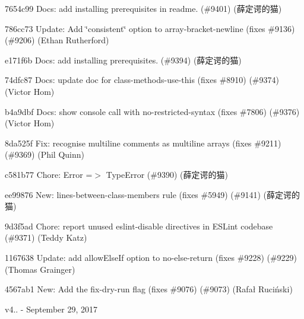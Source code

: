 \begin{DoxyItemize}
\item 7654c99 Docs\+: add installing prerequisites in readme. (\#9401) (薛定谔的猫)
\item 786cc73 Update\+: Add \char`\"{}consistent\char`\"{} option to array-\/bracket-\/newline (fixes \#9136) (\#9206) (Ethan Rutherford)
\item e171f6b Docs\+: add installing prerequisites. (\#9394) (薛定谔的猫)
\item 74dfc87 Docs\+: update doc for class-\/methods-\/use-\/this (fixes \#8910) (\#9374) (Victor Hom)
\item b4a9dbf Docs\+: show console call with no-\/restricted-\/syntax (fixes \#7806) (\#9376) (Victor Hom)
\item 8da525f Fix\+: recognise multiline comments as multiline arrays (fixes \#9211) (\#9369) (Phil Quinn)
\item c581b77 Chore\+: Error =$>$ Type\+Error (\#9390) (薛定谔的猫)
\item ee99876 New\+: lines-\/between-\/class-\/members rule (fixes \#5949) (\#9141) (薛定谔的猫)
\item 9d3f5ad Chore\+: report unused eslint-\/disable directives in E\+S\+Lint codebase (\#9371) (Teddy Katz)
\item 1167638 Update\+: add allow\+Else\+If option to no-\/else-\/return (fixes \#9228) (\#9229) (Thomas Grainger)
\item 4567ab1 New\+: Add the fix-\/dry-\/run flag (fixes \#9076) (\#9073) (Rafał Ruciński)
\end{DoxyItemize}

v4.. -\/ September 29, 2017


